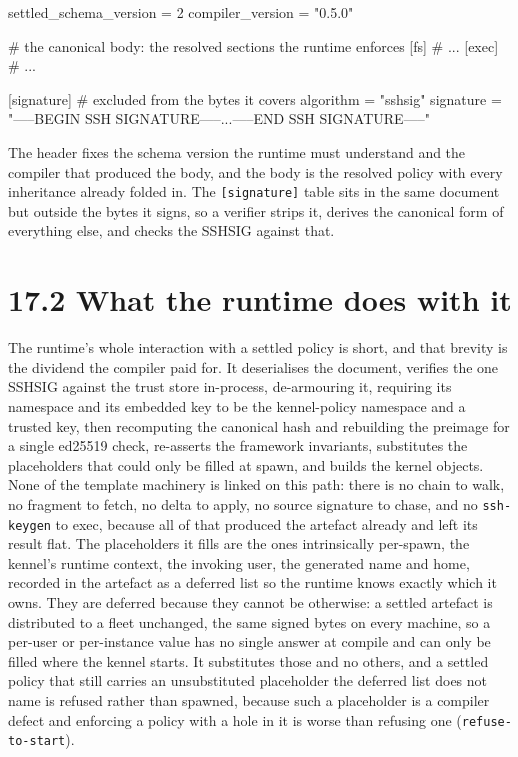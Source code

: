 \begin{kennelcode}
settled_schema_version = 2
compiler_version = "0.5.0"

# the canonical body: the resolved sections the runtime enforces
[fs]
# ...
[exec]
# ...

[signature]            # excluded from the bytes it covers
algorithm = "sshsig"
signature = "-----BEGIN SSH SIGNATURE-----\n...\n-----END SSH SIGNATURE-----\n"
\end{kennelcode}

The header fixes the schema version the runtime must understand and the
compiler that produced the body, and the body is the resolved policy
with every inheritance already folded in. The \texttt{{[}signature{]}}
table sits in the same document but outside the bytes it signs, so a
verifier strips it, derives the canonical form of everything else, and
checks the SSHSIG against that.

\hypertarget{what-the-runtime-does-with-it}{%
\section{17.2 What the runtime does with
it}\label{what-the-runtime-does-with-it}}

The runtime's whole interaction with a settled policy is short, and that
brevity is the dividend the compiler paid for. It deserialises the
document, verifies the one SSHSIG against the trust store in-process,
de-armouring it, requiring its namespace and its embedded key to be the
kennel-policy namespace and a trusted key, then recomputing the
canonical hash and rebuilding the preimage for a single ed25519 check,
re-asserts the framework invariants, substitutes the placeholders that
could only be filled at spawn, and builds the kernel objects. None of
the template machinery is linked on this path: there is no chain to
walk, no fragment to fetch, no delta to apply, no source signature to
chase, and no \texttt{ssh-keygen} to exec, because all of that produced
the artefact already and left its result flat. The placeholders it fills
are the ones intrinsically per-spawn, the kennel's runtime context, the
invoking user, the generated name and home, recorded in the artefact as
a deferred list so the runtime knows exactly which it owns. They are
deferred because they cannot be otherwise: a settled artefact is
distributed to a fleet unchanged, the same signed bytes on every
machine, so a per-user or per-instance value has no single answer at
compile and can only be filled where the kennel starts. It substitutes
those and no others, and a settled policy that still carries an
unsubstituted placeholder the deferred list does not name is refused
rather than spawned, because such a placeholder is a compiler defect and
enforcing a policy with a hole in it is worse than refusing one
(\texttt{refuse-to-start}).


